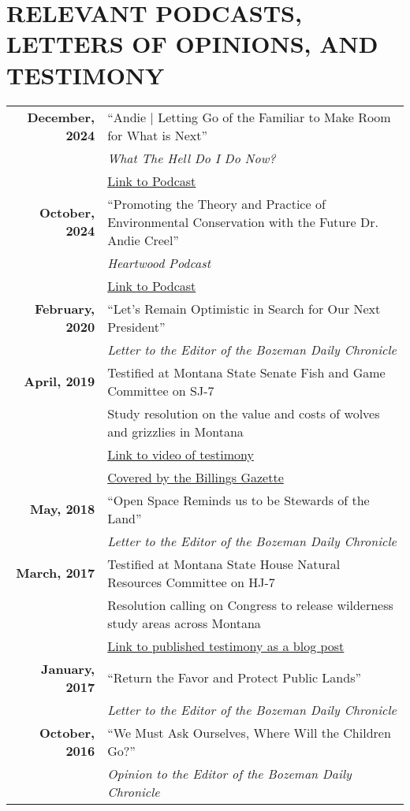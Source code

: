 \documentclass[11pt]{article}
\begin{document}
\section*{RELEVANT PODCASTS, LETTERS OF OPINIONS, AND TESTIMONY}
\begin{tabularx}{\linewidth}{>{\bfseries}r X} %
December, 2024 & “Andie | Letting Go of the Familiar to Make Room for What is Next” \\
    & \textit{What The Hell Do I Do Now?}\\
    & \href{https://open.spotify.com/episode/7bswDIxoYApUMYuF7UPw6C?si=b8d9c4fdcc804742}{Link to Podcast} \\[1ex]
October, 2024 & “Promoting the Theory and Practice of Environmental Conservation with the Future Dr. Andie Creel” \\
    & \textit{Heartwood Podcast} \\
    & \href{https://podcasts.apple.com/us/podcast/heartwood/id1474971310?i=1000673543724}{Link to Podcast} \\[1ex]
February, 2020 & “Let’s Remain Optimistic in Search for Our Next President” \\
    & \textit{Letter to the Editor of the Bozeman Daily Chronicle} \\[1ex]
April, 2019 & Testified at Montana State Senate Fish and Game Committee on SJ-7 \\
    & Study resolution on the value and costs of wolves and grizzlies in Montana \\
    & \href{https://www.facebook.com/watch/?v=2242142425832448}{Link to video of testimony} \\
    & \href{https://billingsgazette.com/outdoors/montana-could-study-of-economic-costs-benefits-of-wolves-grizzlies/article_4cba1d42-20a7-535b-a06c-49b800b1fe67.html?fbclid=IwAR2AH4iV9oVMiqb84HeFRVAxnHxhk-furTRHPYwgPYg9yOZv9gZg9rW6eJ4}{Covered by the Billings Gazette} \\[1ex]
May, 2018 & “Open Space Reminds us to be Stewards of the Land” \\
    & \textit{Letter to the Editor of the Bozeman Daily Chronicle}\\[1ex]
March, 2017 & Testified at Montana State House Natural Resources Committee on HJ-7 \\
    & Resolution calling on Congress to release wilderness study areas across Montana \\
    & \href{https://linktoblogpost.com}{Link to published testimony as a blog post} \\[1ex]
January, 2017 & “Return the Favor and Protect Public Lands” \\
    & \textit{Letter to the Editor of the Bozeman Daily Chronicle} \\[1ex]
October, 2016 & “We Must Ask Ourselves, Where Will the Children Go?” \\
    & \textit{Opinion to the Editor of the Bozeman Daily Chronicle} \\
\end{tabularx}
\end{document}
